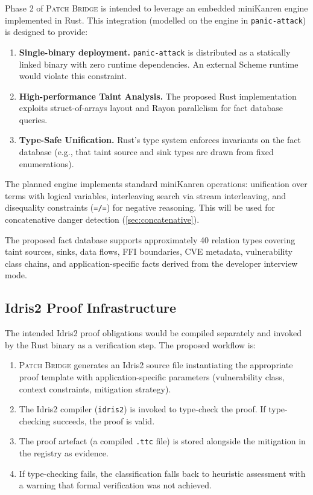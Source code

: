 \documentclass[11pt,twocolumn]{article}
\begin{document}
Phase 2 of \textsc{Patch Bridge} is intended to leverage an embedded miniKanren engine
implemented in Rust. This integration (modelled on the engine in
\texttt{panic-attack}) is designed to provide:

\begin{enumerate}[nosep]
  \item \textbf{Single-binary deployment.} \texttt{panic-attack} is
    distributed as a statically linked binary with zero runtime
    dependencies. An external Scheme runtime would violate this
    constraint.
  \item \textbf{High-performance Taint Analysis.} The proposed Rust
    implementation exploits struct-of-arrays layout and Rayon
    parallelism for fact database queries.
  \item \textbf{Type-Safe Unification.} Rust's type system enforces
    invariants on the fact database (e.g., that taint source and sink
    types are drawn from fixed enumerations).
\end{enumerate}

The planned engine implements standard miniKanren operations: unification
over terms with logical variables, interleaving search via stream
interleaving, and disequality constraints (\texttt{=/=}) for negative
reasoning. This will be used for concatenative danger detection
(\cref{sec:concatenative}).

The proposed fact database supports approximately 40 relation types covering
taint sources, sinks, data flows, FFI boundaries, CVE metadata,
vulnerability class chains, and application-specific facts derived
from the developer interview mode.

\subsection{Idris2 Proof Infrastructure}

The intended Idris2 proof obligations would be compiled separately and
invoked by the Rust binary as a verification step. The proposed workflow
is:

\begin{enumerate}[nosep]
  \item \textsc{Patch Bridge} generates an Idris2 source file
    instantiating the appropriate proof template with
    application-specific parameters (vulnerability class, context
    constraints, mitigation strategy).
  \item The Idris2 compiler (\texttt{idris2}) is invoked to type-check
    the proof. If type-checking succeeds, the proof is valid.
  \item The proof artefact (a compiled \texttt{.ttc} file) is stored
    alongside the mitigation in the registry as evidence.
  \item If type-checking fails, the classification falls back to
    heuristic assessment with a warning that formal verification was
    not achieved.
\end{enumerate}
\end{document}
